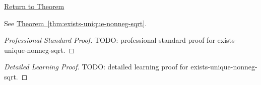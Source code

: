 \newpage
{}
\label{prf:exists-unique-nonneg-sqrt}

\begin{remark*}[Return]
\hyperref[thm:exists-unique-nonneg-sqrt]{Return to Theorem}
\end{remark*}

\begin{theorem*}
See \hyperref[thm:exists-unique-nonneg-sqrt]{Theorem~\ref*{thm:exists-unique-nonneg-sqrt}}.
\end{theorem*}

\begin{proof}[Professional Standard Proof]
\LRAProofBodyStart
TODO: professional standard proof for exists-unique-nonneg-sqrt.
\end{proof}

\begin{proof}[Detailed Learning Proof]
\LRAProofBodyStart
TODO: detailed learning proof for exists-unique-nonneg-sqrt.
\end{proof}

\begin{remark*}
\end{remark*}

\begin{dependencies}
\NoLocalDependencies
\end{dependencies}

\clearpage
